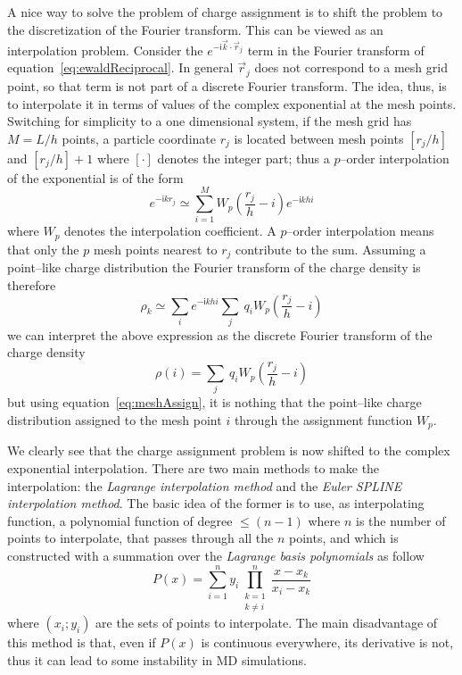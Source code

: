 A nice way to solve the problem of charge assignment is to shift the problem to the discretization of the Fourier 
transform. This can be viewed as an interpolation problem. Consider the $e^{-\mathsf{i}\vec k\cdot \vec r_j}$ 
term in the Fourier transform of equation~\eqref{eq:ewaldReciprocal}. In general $\vec r_j$ does not correspond 
to a mesh grid point, so that term is not part of a discrete Fourier transform. The idea, thus, is to interpolate 
it in terms of values of the complex exponential at the mesh points. Switching for simplicity to a one 
dimensional system, if the mesh grid has $M = L/h$ points, a particle coordinate $r_j$ is located between mesh 
points $[r_j/h]$ and $[r_j/h] + 1$ where $[\cdot]$ denotes the integer part; thus a $p$--order interpolation of 
the exponential is of the form
\begin{equation*}
	e^{-\mathsf{i}kr_j} \simeq \sum_{i=1}^M W_{p}\left ( \frac{r_j}{h} - i \right ) e^{-\mathsf{i}khi}
\end{equation*}
where $W_{p}$ denotes the interpolation coefficient. A $p$--order interpolation means that only the $p$ mesh 
points nearest to $r_j$ contribute to the sum. Assuming a point--like charge distribution the Fourier transform 
of the charge density is therefore
\begin{equation*}
	\rho_k \simeq \sum_{i}e^{-\mathsf{i}khi} \sum_j\ q_iW_{p} \left ( \frac{r_j}{h} - i \right )
\end{equation*}
we can interpret the above expression as the discrete Fourier transform of the charge density
\begin{equation*}
	\rho(i) = \sum_j\ q_iW_{p} \left ( \frac{r_j}{h} - i \right )
\end{equation*}
but using equation~\eqref{eq:meshAssign}, it is nothing that the point--like charge distribution assigned to the 
mesh point $i$ through the assignment function $W_{p}$.

We clearly see that the charge assignment problem is now shifted to the complex exponential interpolation. There 
are two main methods to make the interpolation: the \textit{Lagrange interpolation method} and the \textit{Euler 
SPLINE interpolation method}. The basic idea of the former is to use, as interpolating function, a polynomial 
function of degree $ \le (n-1)$ where $n$ is the number of points to interpolate, that passes through all the $n$ 
points, and which is constructed with a summation over the \textit{Lagrange basis polynomials} as follow
\begin{equation*}
	P(x) = \sum_{i=1}^n y_i \prod_{\substack{k=1\\k\ne i}}^n \frac{x-x_k}{x_i - x_k}
\end{equation*}
where $(x_i;y_i)$ are the sets of points to interpolate. The main disadvantage of this method is that, even if 
$P(x)$ is continuous everywhere, its derivative is not, thus it can lead to some instability in \ac{MD} 
simulations.

